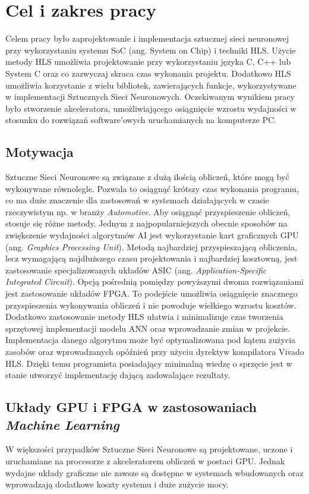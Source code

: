 \newpage %
\cleardoublepage %
\pagestyle{headings}

\section{Cel i zakres pracy}
Celem pracy było zaprojektowanie i implementacja sztucznej sieci neuronowej 
przy wykorzystaniu systemu SoC (ang. System on Chip) i techniki HLS. 
Użycie metody HLS umożliwia projektowanie przy wykorzystaniu języka 
C, C++ lub System C oraz co zazwyczaj skraca czas wykonania projektu.  
Dodatkowo HLS umożliwia korzystanie z wielu bibliotek, zawierających funkcje, wykorzystywane w implementacji 
Sztucznych Sieci Neuronowych. Oczekiwanym wynikiem pracy było stworzenie akceleratora, umożliwiającego osiągnięcie 
wzrostu wydajności w stosunku do rozwiązań software’owych uruchamianych na komputerze PC.

\subsection{Motywacja}
Sztuczne Sieci Neuronowe są związane z dużą ilością obliczeń, które mogą 
być wykonywane równolegle. Pozwala to osiągnąć krótszy czas wykonania 
programu, co ma duże znaczenie dla zastosowań w systemach działających 
w czasie rzeczywistym np. w branży \emph{Automotive}. Aby osiągnąć przyspieszenie 
obliczeń, stosuje się różne metody. Jednym z najpopularniejszych obecnie sposobów 
na zwiększenie wydajności algorytmów AI jest wykorzystanie kart graficznych GPU 
(ang. \emph{Graphics Processing Unit}). Metodą najbardziej przyspieszającą obliczenia,
lecz wymagającą najdłuższego czasu projektowania i najbardziej kosztowną,
jest zastosowanie specjalizowanych układów ASIC (ang. \emph{Application-Specific 
Integrated Circuit}). Opcją pośrednią pomiędzy powyższymi dwoma rozwiązaniami
jest zastosowanie układów FPGA. To podejście umożliwia osiągnięcie znacznego
przyspieszenia wykonywania obliczeń i nie powoduje wielkiego wzrostu kosztów. 
Dodatkowo zastosowanie metody HLS ułatwia i minimalizuje czas tworzenia sprzętowej 
implementacji modelu ANN oraz wprowadzanie zmian w projekcie. Implementacja danego algorytmu może być optymalizowana pod kątem zużycia zasobów oraz wprowadzanych opóźnień przy użyciu dyrektyw kompilatora Vivado HLS. Dzięki temu programista posiadający minimalną wiedzę o sprzęcie jest w stanie utworzyć implementację dającą zadowalające rezultaty.

\subsection{Układy GPU i FPGA w zastosowaniach \emph{Machine Learning}}
W większości przypadków Sztuczne Sieci Neuronowe są projektowane, uczone i uruchamiane na procesorze z akceleratorem obliczeń 
w postaci GPU. Jednak wydajne układy graficzne nie zawsze są dostępne w systemach wbudowanych oraz wprowadzają dodatkowe koszty systemu i duże zużycie mocy.

